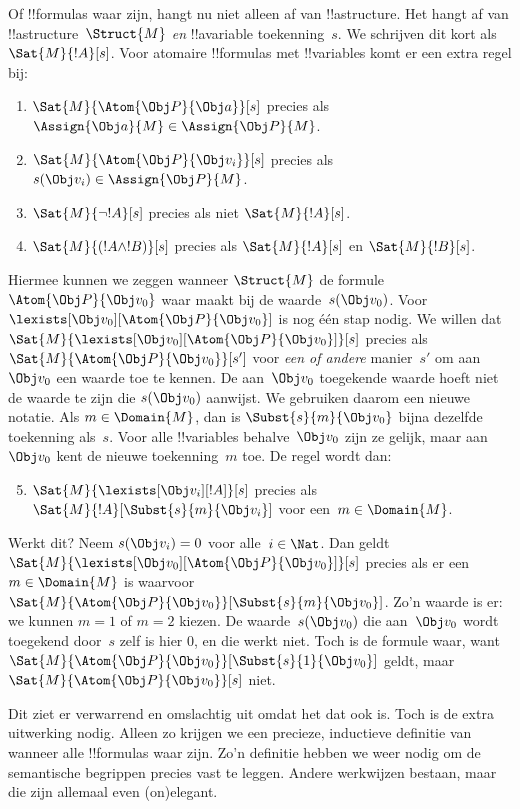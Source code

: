 \documentclass[openany]{memoir}
\begin{document}
Of !!{formula}s waar zijn, hangt nu niet alleen af van
!!a{structure}. Het hangt af van !!a{structure}~$\Struct{M}$ \emph{en}
!!a{variable} toekenning~$s$. We schrijven dit kort als
$\Sat{M}{!A}[s]$. Voor atomaire !!{formula}s met !!{variable}s komt er
een extra regel bij:
\begin{enumerate}
  \item $\Sat{M}{\Atom{\Obj P}{\Obj a}}[s]$ precies als
  $\Assign{\Obj a}{M} \in \Assign{\Obj P}{M}$.
  \item $\Sat{M}{\Atom{\Obj P}{\Obj v_i}}[s]$ precies als
  $s(\Obj v_i) \in \Assign{\Obj P}{M}$.
  \item $\Sat{M}{\lnot !A}[s]$ precies als niet $\Sat{M}{!A}[s]$.
  \item $\Sat{M}{(!A \land !B)}[s]$ precies als $\Sat{M}{!A}[s]$ en $\Sat{M}{!B}[s]$.
\end{enumerate}
Hiermee kunnen we zeggen wanneer $\Struct{M}$ de formule
$\Atom{\Obj P}{\Obj v_0}$ waar maakt bij de waarde~$s(\Obj v_0)$. Voor
$\lexists[\Obj v_0][\Atom{\Obj P}{\Obj v_0}]$ is nog één stap nodig.
We willen dat $\Sat{M}{\lexists[\Obj v_0][\Atom{\Obj P}{\Obj
v_0}]}[s]$ precies als $\Sat{M}{\Atom{\Obj P}{\Obj v_0}}[s']$ voor
\emph{een of andere} manier~$s'$ om aan~$\Obj v_0$ een waarde toe te
kennen. De aan~$\Obj v_0$ toegekende waarde hoeft niet de waarde te zijn
die $s(\Obj v_0)$ aanwijst. We gebruiken daarom een nieuwe notatie. Als
$m \in \Domain{M}$, dan is $\Subst{s}{m}{\Obj v_0}$ bijna dezelfde
toekenning als~$s$. Voor alle !!{variable}s behalve~$\Obj v_0$ zijn ze
gelijk, maar aan $\Obj v_0$ kent de nieuwe toekenning~$m$ toe. De regel
wordt dan:
\begin{enumerate}\setcounter{enumi}{4}
  \item $\Sat{M}{\lexists[\Obj v_i][!A]}[s]$ precies als
  $\Sat{M}{!A}[\Subst{s}{m}{\Obj v_i}]$ voor een~$m \in \Domain{M}$.
\end{enumerate}
Werkt dit? Neem $s(\Obj v_i) = 0$ voor alle~$i \in \Nat$. Dan geldt
$\Sat{M}{\lexists[\Obj v_0][\Atom{\Obj P}{\Obj v_0}]}[s]$ precies als
er een $m \in \Domain{M}$ is waarvoor
$\Sat{M}{\Atom{\Obj P}{\Obj v_0}}[\Subst{s}{m}{\Obj v_0}]$. Zo'n waarde
is er: we kunnen $m = 1$ of $m = 2$ kiezen. De waarde~$s(\Obj v_0)$
die aan~$\Obj v_0$ wordt toegekend door~$s$ zelf is hier $0$, en die
werkt niet. Toch is de formule
waar, want
$\Sat{M}{\Atom{\Obj P}{\Obj v_0}}[\Subst{s}{1}{\Obj v_0}]$ geldt,
maar $\Sat{M}{\Atom{\Obj P}{\Obj v_0}}[s]$ niet.

Dit ziet er verwarrend en omslachtig uit omdat het dat ook is. Toch is
de extra uitwerking nodig. Alleen zo krijgen we een precieze,
inductieve definitie van wanneer alle !!{formula}s waar zijn. Zo'n
definitie hebben we weer nodig om de semantische begrippen precies
vast te leggen. Andere werkwijzen bestaan, maar die zijn allemaal even
(on)elegant.
\endgroup
\end{document}
